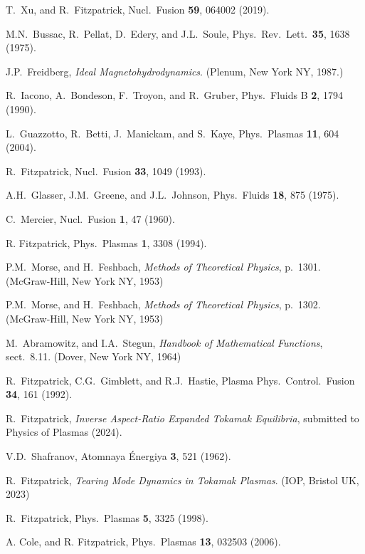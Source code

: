 \documentclass[12pt,prb,aps]{revtex4-1}
\begin{document}
\begin{thebibliography}{99}
 T.~Xu, and R.~Fitzpatrick, Nucl.\ Fusion {\bf 59}, 064002 (2019).

 M.N.~Bussac, R.~Pellat, D.~Edery, and J.L.~Soule, Phys.\ Rev.\ Lett.\ {\bf 35}, 1638 (1975).

 J.P.~Freidberg, {\em Ideal Magnetohydrodynamics}. (Plenum, New York NY, 1987.)

 R.~Iacono, A.~Bondeson, F.~Troyon, and R.~Gruber, Phys.\ Fluids B {\bf 2}, 1794 (1990).

 L.~Guazzotto,  R.~Betti, J.~Manickam, and  S.~Kaye, Phys.\ Plasmas {\bf 11}, 604 (2004).

 R.~Fitzpatrick, Nucl.\ Fusion {\bf 33}, 1049 (1993).

 A.H.~Glasser, J.M.~Greene, and J.L.~Johnson, Phys.\ Fluids {\bf 18}, 875 (1975).

 C.~Mercier, Nucl.\ Fusion {\bf 1}, 47 (1960).

 R. Fitzpatrick, Phys.\ Plasmas {\bf 1}, 3308 (1994).

 P.M.~Morse, and H.~Feshbach, {\em Methods of Theoretical Physics}, p.~1301. (McGraw-Hill, New York NY, 1953)

 P.M.~Morse, and H.~Feshbach, {\em Methods of Theoretical Physics}, p.~1302. (McGraw-Hill, New York NY, 1953)

 M.~Abramowitz, and I.A.~Stegun, {\em Handbook of Mathematical Functions}, sect.~8.11. (Dover, New York NY, 1964)

 R.~Fitzpatrick, C.G.~Gimblett, and R.J.~Hastie, Plasma Phys.\ Control.\ Fusion {\bf 34}, 161 (1992). 

 R.~Fitzpatrick, {\em Inverse Aspect-Ratio Expanded Tokamak Equilibria}, submitted to Physics of Plasmas (2024).

 V.D.~Shafranov, Atomnaya \'{E}nergiya {\bf 3}, 521  (1962).

 R.~Fitzpatrick, {\em Tearing Mode Dynamics in Tokamak Plasmas}. (IOP, Bristol UK,  2023)

 R.~Fitzpatrick, Phys.\ Plasmas {\bf 5}, 3325 (1998).

 A. Cole, and R. Fitzpatrick, Phys.\ Plasmas {\bf 13}, 032503 (2006).

\end{thebibliography}
\end{document}
